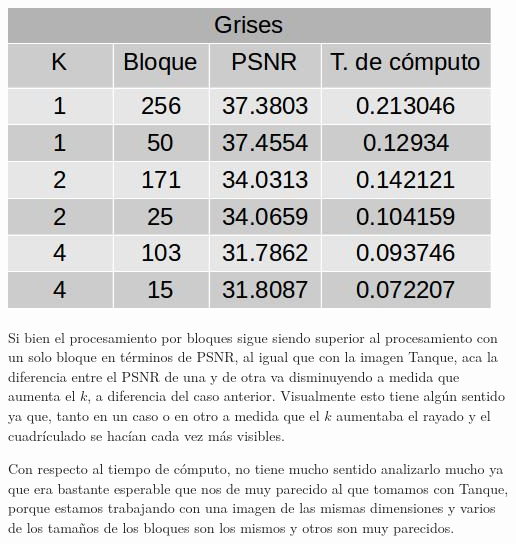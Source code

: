 \documentclass[a4paper]{article}
\begin{document}
\centerline{
\includegraphics[scale=0.5]{imagenes/grisesTabla.jpg}
}

Si bien el procesamiento por bloques sigue siendo superior al procesamiento con un solo bloque en términos de PSNR, al igual que con la imagen Tanque, aca la diferencia entre el PSNR de una y de otra va disminuyendo a medida que aumenta el $k$, a diferencia del caso anterior. Visualmente esto tiene algún sentido ya que, tanto en un caso o en otro a medida que el $k$ aumentaba el rayado y el cuadrículado se hacían cada vez más visibles.
\par Con respecto al tiempo de cómputo, no tiene mucho sentido analizarlo mucho ya que era bastante esperable que nos de muy parecido al que tomamos con Tanque, porque estamos trabajando con una imagen de las mismas dimensiones y varios de los tamaños de los bloques son los mismos y otros son muy parecidos.
\end{document}
